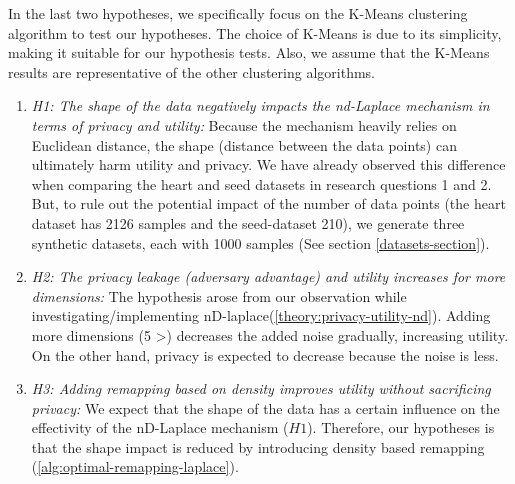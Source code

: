 \begin{enumerate}
        In the last two hypotheses, we specifically focus on the K-Means clustering algorithm to test our hypotheses.
        The choice of K-Means is due to its simplicity, making it suitable for our hypothesis tests.
        Also, we assume that the K-Means results are representative of the other clustering algorithms.
        \begin{enumerate}
          \item \textit{H1: The shape of the data negatively impacts the nd-Laplace mechanism in terms of privacy and utility:}
                Because the mechanism heavily relies on Euclidean distance, the shape (distance between the data points) can ultimately harm utility and privacy.
                We have already observed this difference when comparing the heart and seed datasets in research questions 1 and 2.
                But, to rule out the potential impact of the number of data points (the heart dataset has 2126 samples and the seed-dataset 210), we generate three synthetic datasets, each with 1000 samples (See section \ref{datasets-section}).
          \item \textit{H2: The privacy leakage (adversary advantage) and utility increases for more dimensions:}
                The hypothesis arose from our observation while investigating/implementing nD-laplace(\ref{theory:privacy-utility-nd}).
                Adding more dimensions (5 >) decreases the added noise gradually, increasing utility.
                On the other hand, privacy is expected to decrease because the noise is less.
          \item \textit{H3: Adding remapping based on density improves utility without sacrificing privacy:}
                We expect that the shape of the data has a certain influence on the effectivity of the nD-Laplace mechanism ($H1$).
                Therefore, our hypotheses is that the shape impact is reduced by introducing density based remapping (\ref{alg:optimal-remapping-laplace}).
        \end{enumerate}
\end{enumerate}

